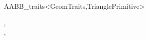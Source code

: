 \begin{ccRefClass}{AABB_traits<GeomTraits,TrianglePrimitive>}
\ccSeeAlso

,\\
, \\








\end{ccRefClass}

\ccRefPageEnd

